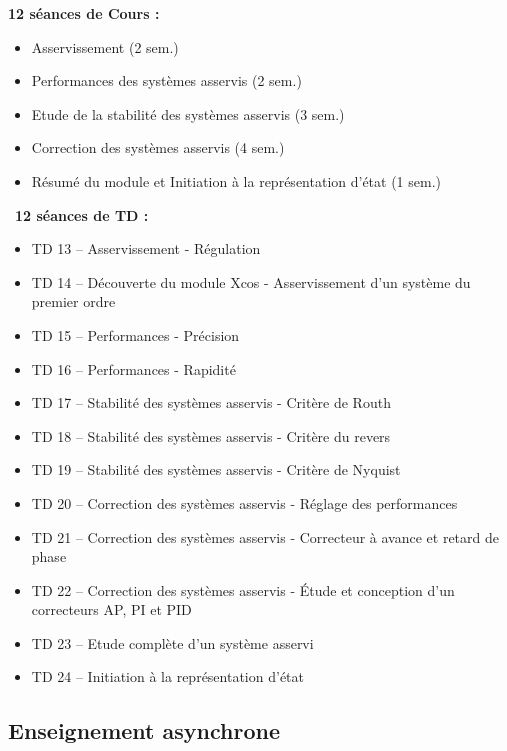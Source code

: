 \documentclass[a4paper,11pt]{article}
\begin{document}
\noindent \textbf{12 séances de Cours :}
\begin{itemize}
    \item Asservissement                                 \hfill (2 sem.)
    \item Performances des systèmes asservis             \hfill (2 sem.)
    \item Etude de la stabilité des systèmes asservis    \hfill (3 sem.)
    \item Correction des systèmes asservis               \hfill (4 sem.)
    \item Résumé du module et Initiation à la représentation d'état  \hfill (1 sem.)
\end{itemize}
$\,$\newline
\noindent \textbf{12 séances de TD :}
\begin{itemize}
    \item TD 13 -- Asservissement - Régulation 
    \item TD 14 -- Découverte du module Xcos - Asservissement d'un système du premier ordre 
    \item TD 15 -- Performances - Précision 
    \item TD 16 -- Performances - Rapidité
    \item TD 17 -- Stabilité des systèmes asservis - Critère de Routh
    \item TD 18 -- Stabilité des systèmes asservis - Critère du revers 
    \item TD 19 -- Stabilité des systèmes asservis - Critère de Nyquist 
    \item TD 20 -- Correction des systèmes asservis - Réglage des performances 
    \item TD 21 -- Correction des systèmes asservis - Correcteur à avance et retard de phase
    \item TD 22 -- Correction des systèmes asservis - \'Etude et conception d'un correcteurs AP, PI et PID 
    \item TD 23 -- Etude complète d'un système asservi
    \item TD 24 -- Initiation à la représentation d'état
\end{itemize}


\subsection*{Enseignement asynchrone}
\end{document}
